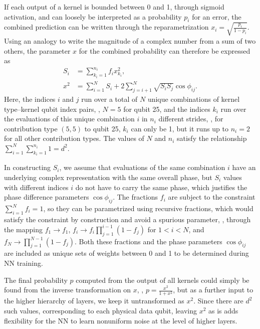 If each output of a kernel is bounded between 0 and 1, through sigmoid activation, and can loosely be interpreted as a probability $p_i$ for an error, the combined prediction can be written through the reparametrization $x_i=\sqrt{\frac{p_i}{1-p_i}}$. Using an analogy to write the magnitude of a complex number from a sum of two others, the parameter $x$ for the combined probability can therefore be expressed as
\begin{equation}
\begin{aligned}
S_i &= \sum_{k_i=1}^{n_i} f_i x^2_{k_i}, \\
x^2 &= \sum_{i=1}^{N} S_i + 2 \sum_{j=i+1}^{N} \sqrt{S_i S_j} \cos{\phi_{ij}}.
\end{aligned}
\label{eq:kernsum}
\end{equation}
Here, the indices $i$ and $j$ run over a total of $N$ unique combinations of kernel type--kernel qubit index pairs, \eg, $N=5$ for qubit 25, and the indices $k_i$ run over the evaluations of this unique combination $i$ in $n_i$ different strides, \eg, for contribution type $(5,5)$ to qubit 25, $k_i$ can only be 1, but it runs up to $n_i=2$ for all other contribution types.
The values of $N$ and $n_i$ satisfy the relationship $\sum_{i=1}^{N} \sum_{k_i=1}^{n_i} 1 = d^2$.

In constructing $S_i$, we assume that evaluations of the same combination $i$ have an underlying complex representation with the same overall phase, but $S_i$ values with different indices $i$ do not have to carry the same phase, which justifies the phase difference parameters $\cos{\phi_{ij}}$.
The fractions $f_i$ are subject to the constraint $\sum_{i=1}^{N} f_i = 1$, so they can be parametrized using recursive fractions, which would satisfy the constraint by construction and avoid a spurious parameter, \ie, through the mapping $f_1 \to f_1$, $f_i \to f_i\prod_{j=1}^{i-1}\left(1-f_j\right)$ for $1<i<N$, and $f_N \to \prod_{j=1}^{N-1}\left(1-f_j\right)$. Both these fractions and the phase parameters $\cos{\phi_{ij}}$ are included as unique sets of weights between 0 and 1 to be determined during NN training.

The final probability $p$ computed from the output of all kernels could simply be found from the inverse transformation on $x$, \ie, $p=\frac{x^2}{1+x^2}$, but as a further input to the higher hierarchy of layers, we keep it untransformed as $x^2$. Since there are $d^2$ such values, corresponding to each physical data qubit, leaving $x^2$ as is adds flexibility for the NN to learn nonuniform noise at the level of higher layers.
